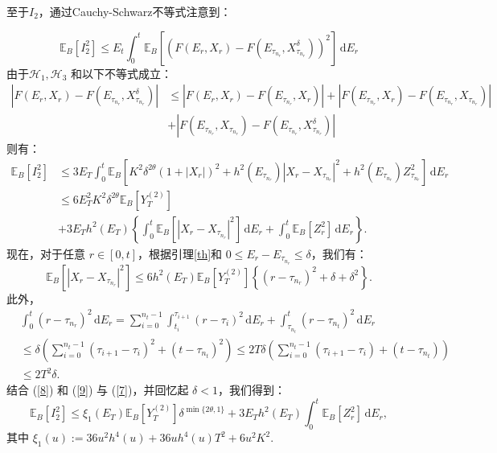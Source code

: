 \documentclass[12pt,final]{article}
\numberwithin{equation}{section}
\numberwithin{figure}{section}
\numberwithin{table}{section}
\theoremstyle{plain}
\begin{document}
	至于$I_2$，通过Cauchy-Schwarz不等式注意到：
	
	$$
	\mathbb{E}_B[I_2^2] \leq E_t \int_0^t \mathbb{E}_B\left[ \left( F(E_r, X_r) - F(E_{\tau_{n_r}}, X_{\tau_{n_r}}^\delta) \right)^2 \right] \, \mathrm{d}E_r
	$$
	由于$\mathcal{H}_1, \mathcal{H}_3$ 和以下不等式成立：
	\begin{align*}
		|F(E_r, X_r) - F(E_{\tau_{n_r}}, X_{\tau_{n_r}}^\delta)| 
		&\leq |F(E_r, X_r) - F(E_{\tau_{n_r}}, X_r)| + |F(E_{\tau_{n_r}}, X_r) - F(E_{\tau_{n_r}}, X_{\tau_{n_r}})| \\
		&+ |F(E_{\tau_{n_r}}, X_{\tau_{n_r}}) - F(E_{\tau_{n_r}}, X_{\tau_{n_r}}^\delta)|
	\end{align*}
	则有：
	\begin{align}\label{7}
		\mathbb{E}_B[I_2^2] &\leq 3 E_T \int_0^t \mathbb{E}_B \left[ K^2 \delta^{2\theta} (1 + |X_r|)^2 + h^2(E_{\tau_{n_r}}) |X_r - X_{\tau_{n_r}}|^2 + h^2(E_{\tau_{n_r}}) Z_{\tau_{n_r}}^2 \right] \, \mathrm{d}E_r\\\nonumber
		&\leq 6 E_T^2 K^2 \delta^{2\theta} \mathbb{E}_B[Y_T^{(2)}] \\\nonumber
		&+ 3 E_T h^2(E_T) \left\{ \int_0^t \mathbb{E}_B[|X_r - X_{\tau_{n_r}}|^2] \, \mathrm{d}E_r + \int_0^t \mathbb{E}_B[Z_r^2] \, \mathrm{d}E_r \right\}.
	\end{align}
	现在，对于任意 $r \in [0, t]$，根据引理\ref{th}和 $0 \leq E_r - E_{\tau_{n_r}} \leq \delta$，我们有：
	\begin{equation}\label{8}
		\mathbb{E}_B[|X_r - X_{\tau_{n_r}}|^2] \leq 6 h^2(E_T) \mathbb{E}_B[Y_T^{(2)}] \left\{(r - \tau_{n_r})^2 + \delta + \delta^2 \right\}. 
	\end{equation}
	此外，
	\begin{align}\label{9}
		&\int_0^t (r - \tau_{n_r})^2 \, \mathrm{d}E_r = \sum_{i=0}^{n_t-1} \int_{t_i}^{\tau_{i+1}} (r - \tau_i)^2 \, \mathrm{d}E_r + \int_{\tau_{n_t}}^t (r - \tau_{n_t})^2 \, \mathrm{d}E_r\\\nonumber
		&\leq \delta \left( \sum_{i=0}^{n_t-1} (\tau_{i+1} - \tau_i)^2 + (t - \tau_{n_t})^2 \right) 
		\leq 2T \delta \left( \sum_{i=0}^{n_t-1} (\tau_{i+1} - \tau_i) + (t - \tau_{n_t}) \right)\\ \nonumber
		&\leq 2T^2 \delta.\nonumber
	\end{align}
	结合 (\ref{8}) 和 (\ref{9}) 与 (\ref{7})，并回忆起 $\delta < 1$，我们得到：
	\begin{equation}\label{10}
		\mathbb{E}_B[I_2^2] \leq \xi_1(E_T) \mathbb{E}_B[Y_T^{(2)}] \delta^{\min\{2\theta, 1\}} + 3 E_T h^2(E_T) \int_0^t \mathbb{E}_B[Z_r^2] \, \mathrm{d}E_r,
	\end{equation}
	其中 $\xi_1(u) := 36 u^2 h^4(u) + 36 u h^4(u) T^2 + 6 u^2 K^2$.
	
\end{document}

